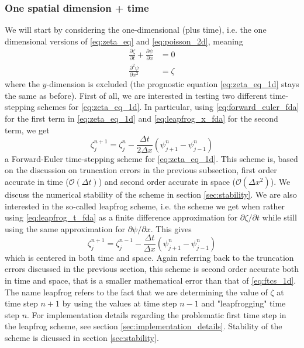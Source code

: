 \documentclass[12pt]{article}
\numberwithin{figure}{section}
\numberwithin{table}{section}
\begin{document}
\subsubsection{One spatial dimension + time} \label{sec:1d_algores}
We will start by considering the one-dimensional (plus time), i.e. the  one dimensional versions of \eqref{eq:zeta_eq} and \eqref{eq:poisson_2d}, meaning
\begin{align}
		\frac{\partial\zeta}{\partial t}+\frac{\partial\psi}{\partial x}&=0 \label{eq:zeta_eq_1d} \\[0.20cm]
    \frac{\partial^2\psi}{\partial x^2}&=\zeta \label{eq:poisson_1d}
\end{align}
where the $y$-dimension is excluded (the prognostic equation \eqref{eq:zeta_eq_1d} stays the same as before). First of all, we are interested in testing two different time-stepping schemes for \eqref{eq:zeta_eq_1d}. In particular, using \eqref{eq:forward_euler_fda} for the first term in \eqref{eq:zeta_eq_1d} and \eqref{eq:leapfrog_x_fda} for the second term, we get
\begin{equation}
	\zeta_j^{n+1}=\zeta_j^n-\frac{\Delta t}{2\Delta x}(\psi_{j+1}^n-\psi_{j-1}^n) \label{eq:ftcs_1d}
\end{equation}
a Forward-Euler time-stepping scheme for \eqref{eq:zeta_eq_1d}. This scheme is, based on the discussion on truncation errors in the previous subsection, first order accurate in time ($\mathcal{O}(\Delta t)$) and second order accurate in space ($\mathcal{O}(\Delta x^2)$). We discuss the numerical stability of the scheme in section \ref{sec:stability}. We are also interested in the so-called leapfrog scheme, i.e. the scheme we get when rather using \eqref{eq:leapfrog_t_fda} as a finite difference approximation for $\partial\zeta/\partial t$ while still using the same approximation for $\partial\psi/\partial x$. This gives
\begin{equation}
	\zeta_j^{n+1}=\zeta_j^{n-1}-\frac{\Delta t}{\Delta x}(\psi_{j+1}^n-\psi_{j-1}^n) \label{eq:ctcs_1d}
\end{equation}
which is centered in both time and space. Again referring back to the truncation errors discussed in the previous section, this scheme is second order accurate both in time and space, that is a smaller mathematical error than that of \eqref{eq:ftcs_1d}. The name leapfrog refers to the fact that we are determining the value of $\zeta$ at time step $n+1$ by using the values at time step $n-1$ and "leapfrogging" time step $n$. For implementation details regarding the problematic first time step in the leapfrog scheme, see section \ref{sec:implementation_details}. Stability of the scheme is dicussed in section \ref{sec:stability}.\\
\end{document}

